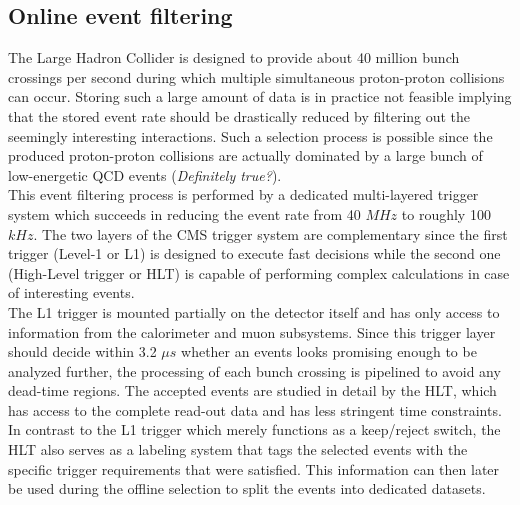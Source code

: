 \subsection{Online event filtering}
The Large Hadron Collider is designed to provide about 40 million bunch crossings per second during which multiple simultaneous proton-proton collisions can occur. Storing such a large amount of data is in practice not feasible implying that the stored event rate should be drastically reduced by filtering out the seemingly interesting interactions. Such a selection process is possible since the produced proton-proton collisions are actually dominated by a large bunch of low-energetic QCD events (\textit{Definitely true?}).
\\
This event filtering process is performed by a dedicated multi-layered trigger system which succeeds in reducing the event rate from 40 $\unit{MHz}$ to roughly 100 $\unit{kHz}$. The two layers of the CMS trigger system are complementary since the first trigger (Level-1 or L1) is designed to execute fast decisions while the second one (High-Level trigger or HLT) is capable of performing complex calculations in case of interesting events.
\\
The L1 trigger is mounted partially on the detector itself and has only access to information from the calorimeter and muon subsystems. Since this trigger layer should decide within 3.2 $\unit{\mu s}$ whether an events looks promising enough to be analyzed further, the processing of each bunch crossing is pipelined to avoid any dead-time regions. The accepted events are studied in detail by the HLT, which has access to the complete read-out data and has less stringent time constraints. In contrast to the L1 trigger which merely functions as a keep/reject switch, the HLT also serves as a labeling system that tags the selected events with the specific trigger requirements that were satisfied. This information can then later be used during the offline selection to split the events into dedicated datasets.

